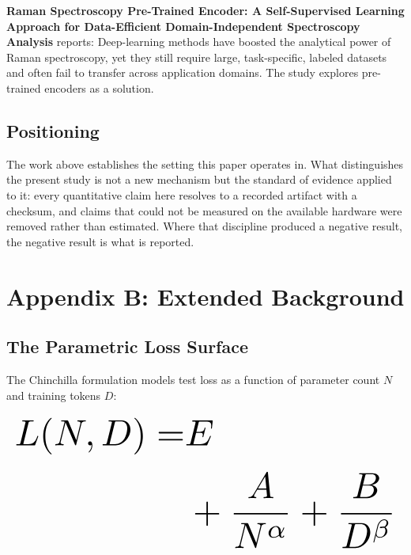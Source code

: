 \documentclass[11pt,a4paper]{article}
\begin{document}
\textbf{Raman Spectroscopy Pre-Trained Encoder: A Self-Supervised Learning Approach for Data-Efficient Domain-Independent Spectroscopy Analysis} \cite{doaj_001772c2113c476d9d5d40452c8e10e1} reports: Deep-learning methods have boosted the analytical power of Raman spectroscopy, yet they still require large, task-specific, labeled datasets and often fail to transfer across application domains. The study explores pre-trained encoders as a solution.


\subsection{Positioning}


The work above establishes the setting this paper operates in. What distinguishes the present study is not a new mechanism but the standard of evidence applied to it: every quantitative claim here resolves to a recorded artifact with a checksum, and claims that could not be measured on the available hardware were removed rather than estimated. Where that discipline produced a negative result, the negative result is what is reported.




\section{Appendix B: Extended Background}



\subsection{The Parametric Loss Surface}


The Chinchilla formulation models test loss as a function of parameter count $N$ and training tokens $D$:










\begin{equation}
\resizebox{\columnwidth}{!}{$\displaystyle
\begin{aligned}
L(N, D) = & E \\
& + \frac{A}{N^{\alpha}} + \frac{B}{D^{\beta}}
\end{aligned}
$}
\end{equation}
\end{document}
